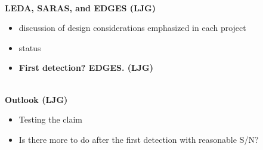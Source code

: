 \emph{}\\

\textbf{LEDA, SARAS, and EDGES (LJG)}

\begin{itemize}
\item
  discussion of design considerations emphasized in each project
\item
  status
\end{itemize}

\begin{itemize}
\item
  \textbf{First detection? EDGES. (LJG)}
\end{itemize}

\textbf{}\\

\textbf{Outlook (LJG)}

\begin{itemize}
\item
  Testing the claim
\item
  Is there more to do after the first detection with reasonable S/N?
\end{itemize}






